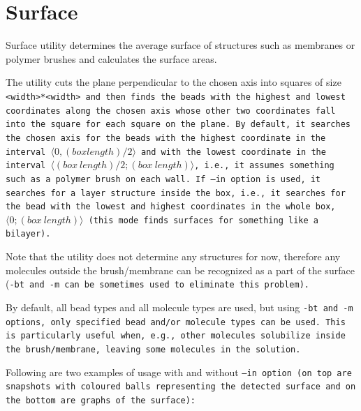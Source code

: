 \section{Surface} \label{sec:Surface}

Surface utility determines the average surface of structures such as
membranes or polymer brushes and calculates the surface areas.

The utility cuts the plane perpendicular to the chosen axis into squares of
size \tt{<width>*<width>} and then finds the beads with the highest and
lowest coordinates along the chosen axis whose other two coordinates fall
into the square for each square on the plane. By default, it searches the
chosen axis for the beads with the highest coordinate in the interval
$\langle0, (box length)/2\rangle$ and with the lowest coordinate in the
interval $\langle(box\ length)/2; (box\ length)\rangle$, i.e., it assumes
something such as a polymer brush on each wall. If \tt{--in}
option is used, it searches for a layer structure inside the box, i.e., it
searches for the bead with the lowest and highest coordinates in the whole
box, $\langle0; (box\ length)\rangle$ (this mode finds surfaces for
something like a bilayer).

Note that the utility does not determine any structures for now, therefore
any molecules outside the brush/membrane can be recognized as a part of the
surface (\tt{-bt} and \tt{-m} can be sometimes used to eliminate
this problem).

By default, all bead types and all molecule types are used, but using
\tt{-bt} and \tt{-m} options, only specified bead and/or molecule
types can be used. This is particularly useful when, e.g., other molecules
solubilize inside the brush/membrane, leaving some molecules in the
solution.

Following are two examples of usage with and without \tt{--in} option
(on top are snapshots with coloured balls representing the detected surface
and on the bottom are graphs of the surface):

